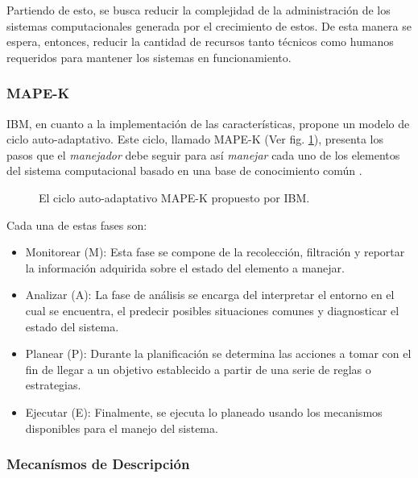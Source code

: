 \documentclass[12pt]{article}
\begin{document}
    Partiendo de esto, se busca reducir la complejidad de la administración de los sistemas computacionales generada por el crecimiento de estos. De esta manera se espera, entonces, reducir la cantidad de recursos tanto técnicos como humanos requeridos para mantener los sistemas en funcionamiento.
    
    \subsubsection{MAPE-K}


    IBM, en cuanto a la implementación de las características, propone un modelo de ciclo auto-adaptativo. Este ciclo, llamado MAPE-K (Ver fig. \ref{fig:mapek}), presenta los pasos que el \textit{manejador} debe seguir para así \textit{manejar} cada uno de los elementos del sistema computacional basado en una base de conocimiento común \cite{Krikava2013}. 

    \begin{figure}[H]
        \centering
        
        \caption{El ciclo auto-adaptativo MAPE-K propuesto por IBM. } \cite{alessandra_2010}
        \label{fig:mapek}
    \end{figure}

    Cada una de estas fases son:

    \begin{itemize}
        \item Monitorear (M): Esta fase se compone de la recolección, filtración y reportar la información adquirida sobre el estado del elemento a manejar.
        \item Analizar (A): La fase de análisis se encarga del interpretar el entorno en el cual se encuentra, el predecir posibles situaciones comunes y diagnosticar el estado del sistema.
        \item Planear (P): Durante la planificación se determina las acciones a tomar con el fin de llegar a un objetivo establecido a partir de una serie de reglas o estrategias.
        \item Ejecutar (E): Finalmente, se ejecuta lo planeado usando los mecanismos disponibles para el manejo del sistema. 
    \end{itemize}

    \subsubsection{Mecanísmos de Descripción}
\end{document}
